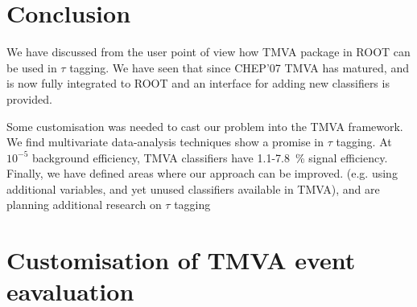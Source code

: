 \documentclass[a4paper]{jpconf}
\begin{document}
\section{Conclusion}
We have discussed from the user point of view how TMVA package in ROOT can be used in $\tau$ tagging.
We have seen that since CHEP'07 TMVA has matured, and is now fully integrated to ROOT
and an interface for adding new classifiers is provided.

Some customisation was needed to cast our problem into the TMVA framework.
We find multivariate data-analysis techniques show a promise in $\tau$ tagging.
At  $10^{-5}$ background efficiency, TMVA classifiers have 1.1-7.8~\% signal efficiency.
Finally, we have defined areas where our approach can be improved. 
(e.g. using additional variables, and yet unused classifiers available in TMVA), 
and are planning additional research on $\tau$ tagging




\appendix %
\section{Customisation of TMVA event eavaluation}









\end{document}
